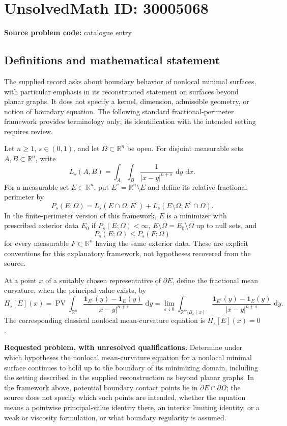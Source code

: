 \documentclass[11pt]{article}
\newcommand{\R}{\mathbb{R}}
\newcommand{\dd}{\,\mathrm{d}}
\begin{document}
\section*{UnsolvedMath ID: 30005068}
\textbf{Source problem code:} catalogue entry
\subsection{Definitions and mathematical statement}
The supplied record asks about boundary behavior of nonlocal minimal surfaces, with particular emphasis in its reconstructed statement on surfaces beyond planar graphs. It does not specify a kernel, dimension, admissible geometry, or notion of boundary equation. The following standard fractional-perimeter framework provides terminology only; its identification with the intended setting requires review.

Let \(n\geq 1\), \(s\in(0,1)\), and let \(\Omega\subset\R^n\) be open. For disjoint measurable sets \(A,B\subset\R^n\), write
\[
L_s(A,B)=\int_A\int_B\frac{1}{|x-y|^{n+s}}\,\dd y\,\dd x.
\]
For a measurable set \(E\subset\R^n\), put \(E^c=\R^n\setminus E\) and define its relative fractional perimeter by
\[
P_s(E;\Omega)=L_s(E\cap\Omega,E^c)+L_s(E\setminus\Omega,E^c\cap\Omega).
\]
In the finite-perimeter version of this framework, \(E\) is a minimizer with prescribed exterior data \(E_0\) if \(P_s(E;\Omega)<\infty\), \(E\setminus\Omega=E_0\setminus\Omega\) up to null sets, and
\[
P_s(E;\Omega)\leq P_s(F;\Omega)
\]
for every measurable \(F\subset\R^n\) having the same exterior data. These are explicit conventions for this explanatory framework, not hypotheses recovered from the source.

At a point \(x\) of a suitably chosen representative of \(\partial E\), define the fractional mean curvature, when the principal value exists, by
\[
H_s[E](x)=\operatorname{PV}\int_{\R^n}
\frac{\mathbf{1}_{E^c}(y)-\mathbf{1}_E(y)}{|x-y|^{n+s}}\,\dd y
=\lim_{\varepsilon\downarrow0}\int_{\R^n\setminus B_\varepsilon(x)}
\frac{\mathbf{1}_{E^c}(y)-\mathbf{1}_E(y)}{|x-y|^{n+s}}\,\dd y.
\]
The corresponding classical nonlocal mean-curvature equation is \(H_s[E](x)=0\).

\textbf{Requested problem, with unresolved qualifications.} Determine under which hypotheses the nonlocal mean-curvature equation for a nonlocal minimal surface continues to hold up to the boundary of its minimizing domain, including the setting described in the supplied reconstruction as beyond planar graphs. In the framework above, potential boundary contact points lie in \(\partial E\cap\partial\Omega\); the source does not specify which such points are intended, whether the equation means a pointwise principal-value identity there, an interior limiting identity, or a weak or viscosity formulation, or what boundary regularity is assumed.
\end{document}
